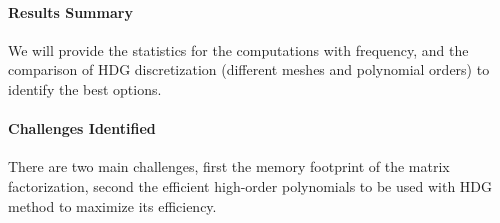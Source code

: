 \paragraph{Results Summary}
We will provide the statistics for the computations with frequency, and 
the comparison of HDG discretization (different meshes and polynomial orders)
to identify the best options.

\paragraph{Challenges Identified} 
There are two main challenges, first the memory footprint of the matrix factorization,
second the efficient high-order polynomials to be used with HDG method to maximize its
efficiency.


%

